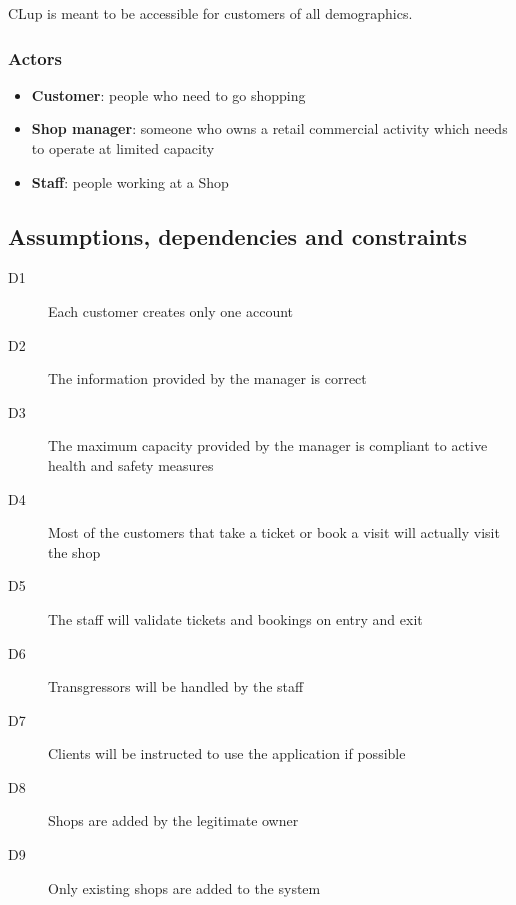 CLup is meant to be accessible for customers of all demographics.

\subsubsection{Actors}
\begin{itemize}
    \item \textbf{Customer}: people who need to go shopping
    \item \textbf{Shop manager}: someone who owns a retail commercial activity which needs to operate at limited capacity
    \item \textbf{Staff}: people working at a Shop
\end{itemize}

\subsection{Assumptions, dependencies and constraints}
\begin{description}
    \item[D1] Each customer creates only one account
    \item[D2] The information provided by the manager is correct
    \item[D3] The maximum capacity provided by the manager is compliant to active health and safety measures
    \item[D4] Most of the customers that take a ticket or book a visit will actually visit the shop
    \item[D5] The staff will validate tickets and bookings on entry and exit
    \item[D6] Transgressors will be handled by the staff
    \item[D7] Clients will be instructed to use the application if possible
    \item[D8] Shops are added by the legitimate owner
    \item[D9] Only existing shops are added to the system
\end{description}